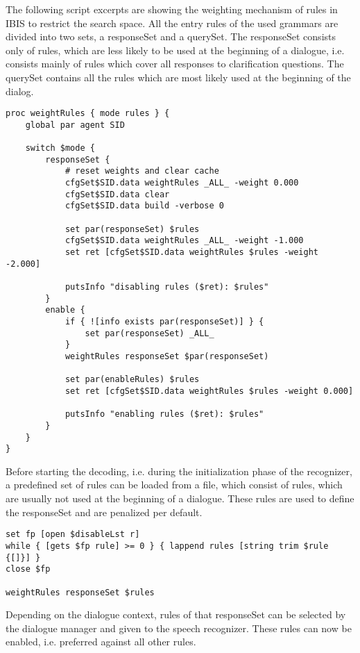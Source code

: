 The following script excerpts are showing the weighting mechanism of
rules in IBIS to restrict the search space. All the entry rules of the
used grammars are divided into two sets, a responseSet and a querySet.
The responseSet consists only of rules, which are less likely to be
used at the beginning of a dialogue, i.e.  consists mainly of rules
which cover all responses to clarification questions. The querySet
contains all the rules which are most likely used at the beginning of
the dialog.

\begin{verbatim}
proc weightRules { mode rules } {
    global par agent SID

    switch $mode {
        responseSet {
            # reset weights and clear cache
            cfgSet$SID.data weightRules _ALL_ -weight 0.000
            cfgSet$SID.data clear
            cfgSet$SID.data build -verbose 0

            set par(responseSet) $rules
            cfgSet$SID.data weightRules _ALL_ -weight -1.000
            set ret [cfgSet$SID.data weightRules $rules -weight -2.000]

            putsInfo "disabling rules ($ret): $rules"
        }
        enable {
            if { ![info exists par(responseSet)] } {
                set par(responseSet) _ALL_
            }
            weightRules responseSet $par(responseSet)

            set par(enableRules) $rules
            set ret [cfgSet$SID.data weightRules $rules -weight 0.000]

            putsInfo "enabling rules ($ret): $rules"
        }
    }
}
\end{verbatim}

Before starting the decoding, i.e. during the initialization phase of
the recognizer, a predefined set of rules can be loaded from a file,
which consist of rules, which are usually not used at the beginning of
a dialogue. These rules are used to define the responseSet and are
penalized per default.

\begin{verbatim}
set fp [open $disableLst r]
while { [gets $fp rule] >= 0 } { lappend rules [string trim $rule {[]}] }
close $fp

weightRules responseSet $rules
\end{verbatim}

Depending on the dialogue context, rules of that responseSet can be
selected by the dialogue manager and given to the speech recognizer.
These rules can now be enabled, i.e. preferred against all other
rules.

